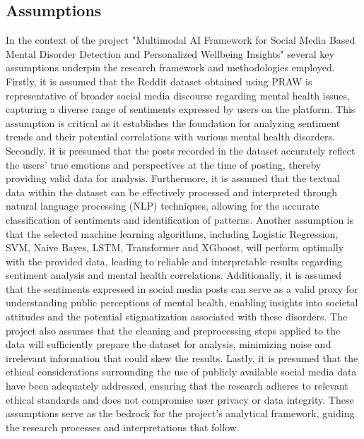 \subsection{Assumptions}
\noindent
In the context of the project "Multimodal AI Framework for Social Media Based Mental Disorder Detection and Personalized Wellbeing Insights" several key assumptions underpin the research framework and methodologies employed. Firstly, it is assumed that the Reddit dataset obtained using PRAW is representative of broader social media discourse regarding mental health issues, capturing a diverse range of sentiments expressed by users on the platform. This assumption is critical as it establishes the foundation for analyzing sentiment trends and their potential correlations with various mental health disorders. Secondly, it is presumed that the posts recorded in the dataset accurately reflect the users' true emotions and perspectives at the time of posting, thereby providing valid data for analysis. Furthermore, it is assumed that the textual data within the dataset can be effectively processed and interpreted through natural language processing (NLP) techniques, allowing for the accurate classification of sentiments and identification of patterns. Another assumption is that the selected machine learning algorithms, including Logistic Regression, SVM, Naive Bayes, LSTM, Transformer and XGboost, will perform optimally with the provided data, leading to reliable and interpretable results regarding sentiment analysis and mental health correlations. Additionally, it is assumed that the sentiments expressed in social media posts can serve as a valid proxy for understanding public perceptions of mental health, enabling insights into societal attitudes and the potential stigmatization associated with these disorders. The project also assumes that the cleaning and preprocessing steps applied to the data will sufficiently prepare the dataset for analysis, minimizing noise and irrelevant information that could skew the results. Lastly, it is presumed that the ethical considerations surrounding the use of publicly available social media data have been adequately addressed, ensuring that the research adheres to relevant ethical standards and does not compromise user privacy or data integrity. These assumptions serve as the bedrock for the project's analytical framework, guiding the research processes and interpretations that follow.

